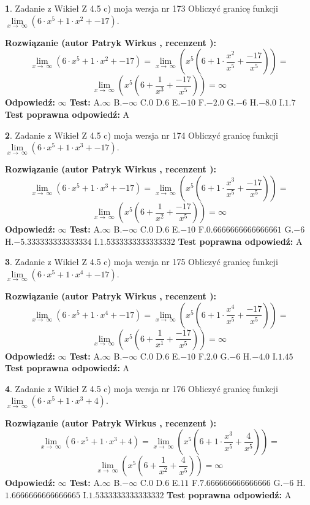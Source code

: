 \documentclass[12pt, a4paper]{article}
\theoremstyle{definition} %
\newtheorem{zad}{}
\newcommand{\zadStart}[1]{\begin{zad}#1\newline}
\newcommand{\zadStop}{\end{zad}}
\newcommand{\rozwStart}[2]{\noindent \textbf{Rozwiązanie (autor #1 , recenzent #2): }\newline}
\newcommand{\rozwStop}{\newline}
\newcommand{\odpStart}{\noindent \textbf{Odpowiedź:}\newline}
\newcommand{\odpStop}{\newline}
\newcommand{\testStart}{\noindent \textbf{Test:}\newline}
\newcommand{\testStop}{\newline}
\newcommand{\kluczStart}{\noindent \textbf{Test poprawna odpowiedź:}\newline}
\newcommand{\kluczStop}{\newline}
\begin{document}
\zadStart{Zadanie z Wikieł Z 4.5 c) moja wersja nr 173}
Obliczyć granicę funkcji  $\lim\limits_{x\to\ \infty}(6 \cdot x^{5}+1 \cdot x^{2}+-17)$.
\zadStop
\rozwStart{Patryk Wirkus}{}
$$\lim\limits_{x\to\ \infty}(6 \cdot x^{5}+1 \cdot x^{2}+-17) = \lim\limits_{x\to\ \infty}(x^{5}(6 +1 \cdot \frac{x^{2}}{x^{5}}+\frac{-17}{x^{5}})) =$$ $$\lim\limits_{x\to\ \infty}(x^{5}(6 +\frac{1}{x^{3}}+\frac{-17}{x^{5}})) =\infty$$
\rozwStop
\odpStart
$\infty$
\odpStop
\testStart
A.$\infty$ B.$-\infty$ C.$0$ D.$6$ E.$-10$
F.$-2.0$ G.$-6$
H.$-8.0$
I.$1.7$
\testStop
\kluczStart
A
\kluczStop



\zadStart{Zadanie z Wikieł Z 4.5 c) moja wersja nr 174}
Obliczyć granicę funkcji  $\lim\limits_{x\to\ \infty}(6 \cdot x^{5}+1 \cdot x^{3}+-17)$.
\zadStop
\rozwStart{Patryk Wirkus}{}
$$\lim\limits_{x\to\ \infty}(6 \cdot x^{5}+1 \cdot x^{3}+-17) = \lim\limits_{x\to\ \infty}(x^{5}(6 +1 \cdot \frac{x^{3}}{x^{5}}+\frac{-17}{x^{5}})) =$$ $$\lim\limits_{x\to\ \infty}(x^{5}(6 +\frac{1}{x^{2}}+\frac{-17}{x^{5}})) =\infty$$
\rozwStop
\odpStart
$\infty$
\odpStop
\testStart
A.$\infty$ B.$-\infty$ C.$0$ D.$6$ E.$-10$
F.$0.6666666666666661$ G.$-6$
H.$-5.333333333333334$
I.$1.5333333333333332$
\testStop
\kluczStart
A
\kluczStop



\zadStart{Zadanie z Wikieł Z 4.5 c) moja wersja nr 175}
Obliczyć granicę funkcji  $\lim\limits_{x\to\ \infty}(6 \cdot x^{5}+1 \cdot x^{4}+-17)$.
\zadStop
\rozwStart{Patryk Wirkus}{}
$$\lim\limits_{x\to\ \infty}(6 \cdot x^{5}+1 \cdot x^{4}+-17) = \lim\limits_{x\to\ \infty}(x^{5}(6 +1 \cdot \frac{x^{4}}{x^{5}}+\frac{-17}{x^{5}})) =$$ $$\lim\limits_{x\to\ \infty}(x^{5}(6 +\frac{1}{x^{1}}+\frac{-17}{x^{5}})) =\infty$$
\rozwStop
\odpStart
$\infty$
\odpStop
\testStart
A.$\infty$ B.$-\infty$ C.$0$ D.$6$ E.$-10$
F.$2.0$ G.$-6$
H.$-4.0$
I.$1.45$
\testStop
\kluczStart
A
\kluczStop



\zadStart{Zadanie z Wikieł Z 4.5 c) moja wersja nr 176}
Obliczyć granicę funkcji  $\lim\limits_{x\to\ \infty}(6 \cdot x^{5}+1 \cdot x^{3}+4)$.
\zadStop
\rozwStart{Patryk Wirkus}{}
$$\lim\limits_{x\to\ \infty}(6 \cdot x^{5}+1 \cdot x^{3}+4) = \lim\limits_{x\to\ \infty}(x^{5}(6 +1 \cdot \frac{x^{3}}{x^{5}}+\frac{4}{x^{5}})) =$$ $$\lim\limits_{x\to\ \infty}(x^{5}(6 +\frac{1}{x^{2}}+\frac{4}{x^{5}})) =\infty$$
\rozwStop
\odpStart
$\infty$
\odpStop
\testStart
A.$\infty$ B.$-\infty$ C.$0$ D.$6$ E.$11$
F.$7.666666666666666$ G.$-6$
H.$1.6666666666666665$
I.$1.5333333333333332$
\testStop
\kluczStart
A
\kluczStop
\end{document}
